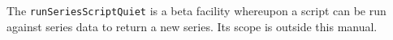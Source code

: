 The \verb+runSeriesScriptQuiet+ is a beta facility whereupon a script can be run against series data to return
a new series. Its scope is outside this manual.
